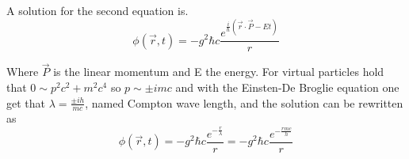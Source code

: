 \documentclass[12pt,a4paper]{book}
\begin{document}
	A solution for the second equation is.
	\begin{equation}
		\phi(\vec{r},t)= - g^2 \hbar c \frac{e^{\frac{i}{\hbar}(\vec{r} \cdot \vec{P}- E t)}}{r} 
		\label{eq:klein-gordon-sol}
	\end{equation}
	
	Where $\vec{P}$ is the linear momentum and E the energy. For virtual particles hold that $0 \sim p^2 c^2 + m^2 c^4$ so $p\sim \pm i m c$ and with the Einsten-De Broglie equation one get that $\lambda = \frac{\pm ih}{mc}$, named Compton wave length, and the solution can be rewritten as
	\begin{equation}
		\phi(\vec{r},t)= - g^2 \hbar c \frac{e^{-\frac{r}{\lambda}}}{r} = - g^2 \hbar c \frac{e^{-\frac{r mc}{h}}}{r}
		\label{eq:klein-gordon-final-sol}
	\end{equation}
	
\end{document}
